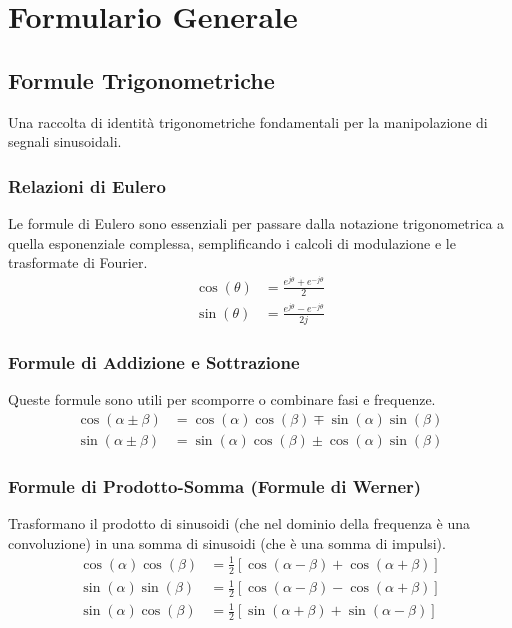 \chapter*{Formulario Generale}

\section{Formule Trigonometriche}
Una raccolta di identità trigonometriche fondamentali per la manipolazione di segnali sinusoidali.

\subsection{Relazioni di Eulero}
Le formule di Eulero sono essenziali per passare dalla notazione trigonometrica a quella esponenziale complessa, semplificando i calcoli di modulazione e le trasformate di Fourier.
\begin{align*}
    \cos(\theta) &= \frac{e^{j\theta} + e^{-j\theta}}{2} \\
    \sin(\theta) &= \frac{e^{j\theta} - e^{-j\theta}}{2j}
\end{align*}

\subsection{Formule di Addizione e Sottrazione}
Queste formule sono utili per scomporre o combinare fasi e frequenze.
\begin{align*}
    \cos(\alpha \pm \beta) &= \cos(\alpha)\cos(\beta) \mp \sin(\alpha)\sin(\beta) \\
    \sin(\alpha \pm \beta) &= \sin(\alpha)\cos(\beta) \pm \cos(\alpha)\sin(\beta)
\end{align*}

\subsection{Formule di Prodotto-Somma (Formule di Werner)}
Trasformano il prodotto di sinusoidi (che nel dominio della frequenza è una convoluzione) in una somma di sinusoidi (che è una somma di impulsi).
\begin{align*}
    \cos(\alpha)\cos(\beta) &= \frac{1}{2}[\cos(\alpha - \beta) + \cos(\alpha + \beta)] \\
    \sin(\alpha)\sin(\beta) &= \frac{1}{2}[\cos(\alpha - \beta) - \cos(\alpha + \beta)] \\
    \sin(\alpha)\cos(\beta) &= \frac{1}{2}[\sin(\alpha + \beta) + \sin(\alpha - \beta)]
\end{align*}


